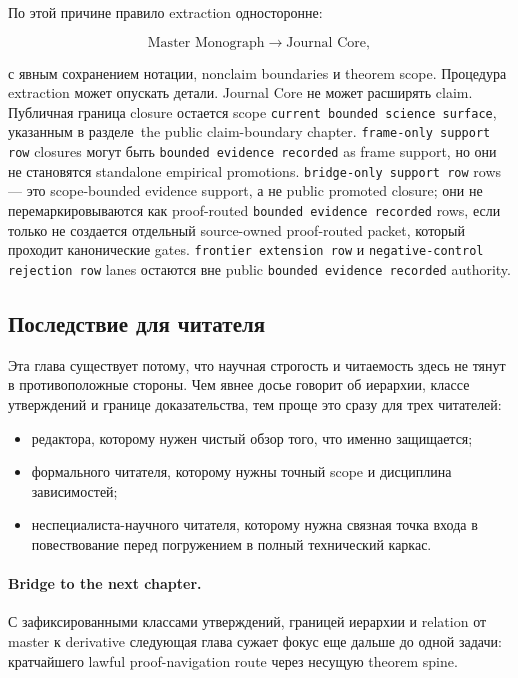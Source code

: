 По этой причине правило extraction односторонне:

\[
\text{Master Monograph} \longrightarrow \text{Journal Core},
\]

с явным сохранением нотации, nonclaim boundaries и theorem scope.
Процедура extraction может опускать детали.
Journal Core не может расширять claim.
Публичная граница closure остается scope
\texttt{current bounded science surface}, указанным в
разделе~the public claim-boundary chapter. \texttt{frame-only support row}
closures могут быть \texttt{bounded evidence recorded} as frame support, но они не становятся
standalone empirical promotions. \texttt{bridge-only support row} rows — это
scope-bounded evidence support, а не public promoted closure; они не
перемаркировываются как proof-routed \texttt{bounded evidence recorded} rows, если только не
создается отдельный source-owned proof-routed packet, который проходит
канонические gates. \texttt{frontier extension row} и \texttt{negative-control rejection row} lanes остаются
вне public \texttt{bounded evidence recorded} authority.

\subsection{Последствие для читателя}

Эта глава существует потому, что научная строгость и читаемость здесь не
тянут в противоположные стороны.
Чем явнее досье говорит об иерархии, классе утверждений и границе
доказательства, тем проще это сразу для трех читателей:

\begin{itemize}
\item редактора, которому нужен чистый обзор того, что именно защищается;
\item формального читателя, которому нужны точный scope и дисциплина
      зависимостей;
\item неспециалиста-научного читателя, которому нужна связная точка входа в
      повествование перед погружением в полный технический каркас.
\end{itemize}

\paragraph{Bridge to the next chapter.}
С зафиксированными классами утверждений, границей иерархии и relation от
master к derivative следующая глава сужает фокус еще дальше до одной задачи:
кратчайшего lawful proof-navigation route через несущую theorem spine.

\clearpage
